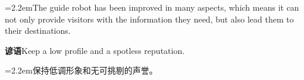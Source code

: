 \documentclass[11pt,a4paper]{article}
\newcommand{\num}[1]{\makebox[1.9em][r]{#1.}\hspace{0.3em}}
\begin{document}
\vspace{0.15em}

\noindent\hangindent=2.2em\hspace{2.2em}The guide robot has been improved in many aspects, which means it can not only provide visitors with the information they need, but also lead them to their destinations.

\vspace{0.4em}\noindent{\color{rulegray}\rule{\textwidth}{0.6pt}}\vspace{0.4em}

\num{5}\textbf{谚语}\quad Keep a low profile and a spotless reputation.

\vspace{0.15em}

\noindent\hangindent=2.2em\hspace{2.2em}保持低调形象和无可挑剔的声誉。
\end{document}
